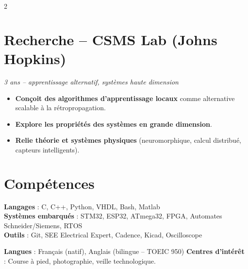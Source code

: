 \documentclass[10pt,a4paper]{article}
\begin{document}
\begin{multicols}{2}
\section*{Recherche – CSMS Lab (Johns Hopkins)}
\textit{3 ans – apprentissage alternatif, systèmes haute dimension}
\begin{itemize}[leftmargin=*]
    \item \textbf{Conçoit des algorithmes d’apprentissage locaux} comme alternative scalable à la rétropropagation.
    \item \textbf{Explore les propriétés des systèmes en grande dimension}.
    \item \textbf{Relie théorie et systèmes physiques} (neuromorphique, calcul distribué, capteurs intelligents).
\end{itemize}

\end{multicols}

\vspace{0.1cm}
\section*{Compétences}
\textbf{Langages} : C, C++, Python, VHDL, Bash, Matlab \\
\textbf{Systèmes embarqués} : STM32, ESP32, ATmega32, FPGA, Automates Schneider/Siemens, RTOS \\
\textbf{Outils} : Git, SEE Electrical Expert, Cadence, Kicad, Oscilloscope
\vspace{0.2cm}

\noindent
\textbf{Langues} : Français (natif), Anglais (bilingue – TOEIC 950) \hfill
\textbf{Centres d’intérêt} : Course à pied, photographie, veille technologique.
\end{document}
